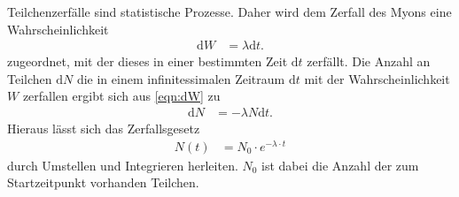 Teilchenzerfälle sind statistische Prozesse. Daher wird dem Zerfall des Myons
eine Wahrscheinlichkeit 
\begin{align}
    \text{d}W &= \lambda \text{d}t.
    \label{eqn:dW}
\end{align}
zugeordnet, mit der dieses in einer bestimmten Zeit $\text{d}t$ zerfällt.
Die Anzahl an Teilchen $\text{d}N$ die in einem infinitessimalen Zeitraum $\text{d}t$ mit der Wahrscheinlichkeit $W$ zerfallen ergibt sich
aus \eqref{eqn:dW} zu 
\begin{align*}
    \text{d}N &= -\lambda N\text{d}t.
\end{align*}
Hieraus lässt sich das Zerfallsgesetz 
\begin{align}
    N(t) &= N_0 \cdot e^{- \lambda \cdot t}\label{eqn:Zerfallsgesetz}
\end{align}
durch Umstellen und Integrieren herleiten. $N_0$ ist dabei die Anzahl der zum Startzeitpunkt vorhanden Teilchen. 

